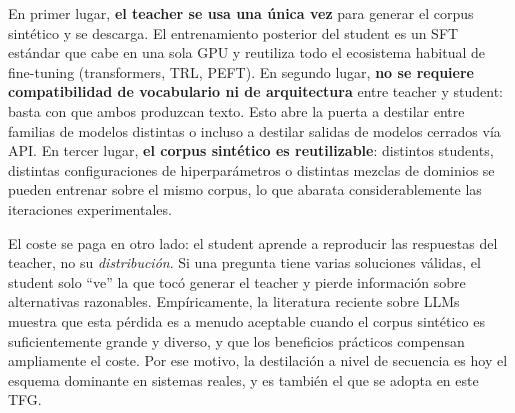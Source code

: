 En primer lugar, \textbf{el teacher se usa una única vez} para generar el corpus sintético y se descarga. El entrenamiento posterior del student es un SFT estándar que cabe en una sola GPU y reutiliza todo el ecosistema habitual de fine-tuning (transformers, TRL, PEFT). En segundo lugar, \textbf{no se requiere compatibilidad de vocabulario ni de arquitectura} entre teacher y student: basta con que ambos produzcan texto. Esto abre la puerta a destilar entre familias de modelos distintas o incluso a destilar salidas de modelos cerrados vía API. En tercer lugar, \textbf{el corpus sintético es reutilizable}: distintos students, distintas configuraciones de hiperparámetros o distintas mezclas de dominios se pueden entrenar sobre el mismo corpus, lo que abarata considerablemente las iteraciones experimentales.

El coste se paga en otro lado: el student aprende a reproducir las respuestas del teacher, no su \emph{distribución}. Si una pregunta tiene varias soluciones válidas, el student solo ``ve'' la que tocó generar el teacher y pierde información sobre alternativas razonables. Empíricamente, la literatura reciente sobre LLMs muestra que esta pérdida es a menudo aceptable cuando el corpus sintético es suficientemente grande y diverso, y que los beneficios prácticos compensan ampliamente el coste. Por ese motivo, la destilación a nivel de secuencia es hoy el esquema dominante en sistemas reales, y es también el que se adopta en este TFG.

